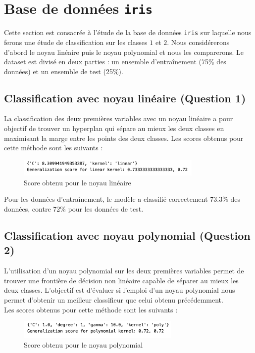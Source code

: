 \documentclass[a4paper,12pt]{article}
\begin{document}
\section{Base de données \texttt{iris}}

Cette section est consacrée à l'étude de la base de données \texttt{iris} sur laquelle nous ferons une étude de classification sur les classes $1$ et $2$.
Nous considérerons d'abord le noyau linéaire puis le noyau polynomial et nous les comparerons.
Le dataset est divisé en deux parties : un ensemble d'entraînement (75\% des données) et un ensemble de test (25\%). 

\subsection{Classification avec noyau linéaire (Question 1)}

La classification des deux premières variables avec un noyau linéaire a pour objectif de trouver un hyperplan qui sépare au mieux les deux classes en maximisant la marge entre les points des deux classes. 
Les scores obtenus pour cette méthode sont les suivants : 

\begin{figure}[H]
    \centering
    \includegraphics[width=0.8\textwidth]{Images/linear_score.png}
    \caption{Score obtenu pour le noyau linéaire}\label{fig : linear}
\end{figure}

Pour les données d'entraînement, le modèle a classifié correctement 73.3\% des données, contre 72\% pour les données de test. 


\subsection{Classification avec noyau polynomial (Question 2)}

L’utilisation d’un noyau polynomial sur les deux premières variables permet de trouver une frontière de décision non linéaire capable de séparer au mieux les deux classes. 
L'objectif est d'évaluer si l'emploi d'un noyau polynomial nous permet d'obtenir un meilleur classifieur que celui obtenu précédemment.\\
Les scores obtenus pour cette méthode sont les suivants :

\begin{figure}[H]
    \centering
    \includegraphics[width=0.7\textwidth]{Images/poly_score.png}
    \caption{Score obtenu pour le noyau polynomial}\label{fig : poly}
\end{figure}
\end{document}
